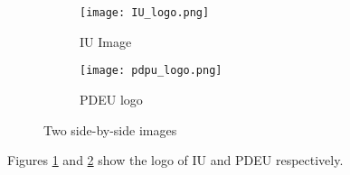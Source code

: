 \documentclass{article}
\begin{document}
\begin{figure}[h]
  \centering
  \begin{subfigure}[b]{0.45\textwidth}
    \texttt{[image: IU\_logo.png]}
    \caption{IU Image}
    \label{fig1a}
  \end{subfigure}
  \hfill
  \begin{subfigure}[b]{0.45\textwidth}
    \texttt{[image: pdpu\_logo.png]}
    \caption{PDEU logo}
    \label{fig1b}
  \end{subfigure}
  \caption{Two side-by-side images}
  \label{fig:1}
\end{figure}
Figures \ref{fig1a} and \ref{fig1b} show the logo of IU and PDEU respectively.
\end{document}
